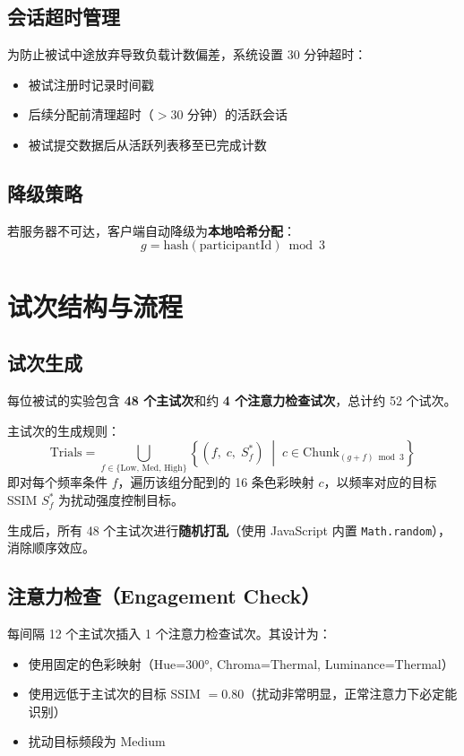 \documentclass{article}
\begin{document}
\subsection{会话超时管理}
为防止被试中途放弃导致负载计数偏差，系统设置 30 分钟超时：
\begin{itemize}
    \item 被试注册时记录时间戳
    \item 后续分配前清理超时（$> 30$ 分钟）的活跃会话
    \item 被试提交数据后从活跃列表移至已完成计数
\end{itemize}

\subsection{降级策略}
若服务器不可达，客户端自动降级为\textbf{本地哈希分配}：
\begin{equation}
g = \text{hash}(\text{participantId}) \bmod 3
\end{equation}


\section{试次结构与流程}

\subsection{试次生成}
每位被试的实验包含 \textbf{48 个主试次}和约 \textbf{4 个注意力检查试次}，总计约 52 个试次。

主试次的生成规则：
\begin{equation}
\text{Trials} = \bigcup_{f \in \{\text{Low, Med, High}\}} \left\{ (f,\; c,\; S_f^*) \;\middle|\; c \in \text{Chunk}_{(g+f) \bmod 3} \right\}
\end{equation}
即对每个频率条件 $f$，遍历该组分配到的 16 条色彩映射 $c$，以频率对应的目标 SSIM $S_f^*$ 为扰动强度控制目标。

生成后，所有 48 个主试次进行\textbf{随机打乱}（使用 JavaScript 内置 \texttt{Math.random}），消除顺序效应。

\subsection{注意力检查（Engagement Check）}
每间隔 12 个主试次插入 1 个注意力检查试次。其设计为：
\begin{itemize}
    \item 使用固定的色彩映射（Hue=300°, Chroma=Thermal, Luminance=Thermal）
    \item 使用远低于主试次的目标 SSIM $= 0.80$（扰动非常明显，正常注意力下必定能识别）
    \item 扰动目标频段为 Medium
\end{itemize}
\end{document}
